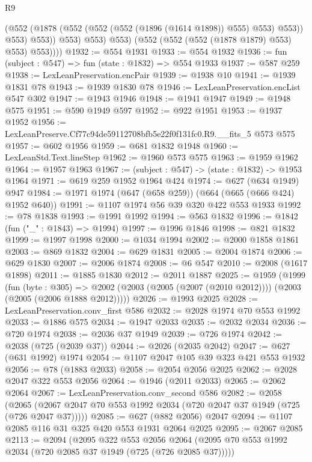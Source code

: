\begin{lexlean}{R9}
\begin{coremodule}
                    (@552 (@1878 (@552 (@552 (@552 (@1896 (@1614 @1898)) @555) @553) @553)) @553)
                    @553))
                @553)
              @553)
            @553)
          (@552 (@552 (@552 (@1878 @1879) @553) @553) @553))))
@1932 := @554 @1931
@1933 := @554 @1932
@1936 := fun (subject : @547) => fun (state : @1832) => @554 @1933
@1937 := @587 @259
@1938 := LexLeanPreservation.encPair
@1939 := @1938 @10
@1941 := @1939 @1831 @78
@1943 := @1939 @1830 @78
@1946 := LexLeanPreservation.encList @547 @302
@1947 := @1943 @1946
@1948 := @1941 @1947
@1949 := @1948 @575
@1951 := @590 @1949 @597
@1952 := @922 @1951
@1953 := @1937 @1952
@1956 := LexLeanPreserve.Cf77c94de59112708bfb5e22f0f131fc0.R9.__fits_5 @573 @575
@1957 := @602 @1956
@1959 := @681 @1832 @1948
@1960 := LexLeanStd.Text.lineStep
@1962 := @1960 @573 @575
@1963 := @1959 @1962
@1964 := @1957 @1963
@1967 := (subject : @547) -> (state : @1832) -> @1953 @1964
@1971 := @619 @259 @1952 @1964 @424
@1974 := @627 (@634 @1949) @947
@1984 := @1971 @1974 (@647 (@658 @259)) (@664 (@665 (@666 @424) @1952 @640))
@1991 := @1107 @1974 @56 @39 @320 @422 @553 @1933
@1992 := @78 @1838
@1993 := @1991 @1992
@1994 := @563 @1832
@1996 := @1842 (fun ("_" : @1843) => @1994)
@1997 := @1996 @1846
@1998 := @821 @1832
@1999 := @1997 @1998
@2000 := @1034 @1994
@2002 := @2000 @1858 @1861
@2003 := @869 @1832
@2004 := @629 @1831
@2005 := @2004 @1874
@2006 := @629 @1830
@2007 := @2006 @1874
@2008 := @6 @547
@2010 := @2008 (@1617 @1898)
@2011 := @1885 @1830
@2012 := @2011 @1887
@2025 := @1959
    (@1999
      (fun (byte : @305) =>
      @2002 (@2003 (@2005 (@2007 (@2010 @2012)))) (@2003 (@2005 (@2006 @1888 @2012)))))
@2026 := @1993 @2025
@2028 := LexLeanPreservation.conv_first @586
@2032 := @2028 @1974 @70 @553 @1992
@2033 := @1886 @575
@2034 := @1947 @2033
@2035 := @2032 @2034
@2036 := @720 @1974
@2038 := @2036 @37 @1949
@2039 := @726 @1974
@2042 := @2038 (@725 (@2039 @37))
@2044 := @2026 (@2035 @2042)
@2047 := @627 (@631 @1992) @1974
@2054 := @1107 @2047 @105 @39 @323 @421 @553 @1932
@2056 := @78 (@1883 @2033)
@2058 := @2054 @2056 @2025
@2062 := @2028 @2047 @322 @553 @2056
@2064 := @1946 (@2011 @2033)
@2065 := @2062 @2064
@2067 := LexLeanPreservation.conv_second @586
@2082 := @2058
    (@2065 (@2067 @2047 @70 @553 @1992 @2034 (@720 @2047 @37 @1949 (@725 (@726 @2047 @37)))))
@2085 := @627 (@882 @2056) @2047
@2094 := @1107 @2085 @116 @31 @325 @420 @553 @1931 @2064 @2025
@2095 := @2067 @2085
@2113 := @2094
    (@2095
      @322
      @553
      @2056
      @2064
      (@2095 @70 @553 @1992 @2034 (@720 @2085 @37 @1949 (@725 (@726 @2085 @37)))))

\end{coremodule}
\end{lexlean}
